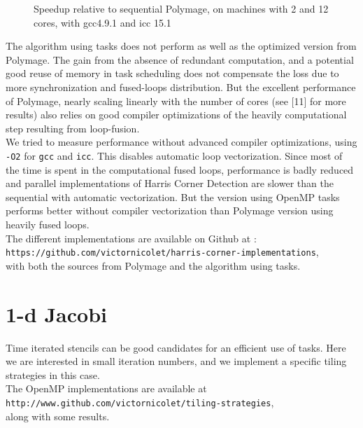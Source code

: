 \documentclass[a4paper,11pt]{article}
\begin{document}
\begin{figure}[h]
  \begin{center}
    
  \end{center}
  \caption{Speedup relative to sequential Polymage, on machines with 2 and 12 cores,
with gcc4.9.1 and icc 15.1}
  \label{results_hcd}
\end{figure}

The algorithm using tasks does not perform as well as the optimized version from Polymage. 
The gain from the absence of redundant computation, and a potential good reuse
of memory in task scheduling does not compensate the loss due to more synchronization
and fused-loops distribution. But the excellent performance of Polymage, nearly scaling
linearly with the number of cores (see [11] for more results) also relies on good compiler
optimizations of the heavily computational step resulting from loop-fusion.\\
We tried to measure performance without advanced compiler optimizations, using \texttt{-O2} for
\texttt{gcc} and \texttt{icc}. This disables automatic loop vectorization. Since most of the time is spent in
the computational fused loops, performance is badly reduced and parallel implementations
of Harris Corner Detection are slower than the sequential with automatic vectorization. 
But the version using OpenMP tasks performs better without compiler vectorization than
Polymage version using heavily fused loops. \\
The different implementations are available on Github at :\\
\texttt{https://github.com/victornicolet/harris-corner-implementations},\\
with both the sources from Polymage and the algorithm using tasks.



\section{1-d Jacobi}
Time iterated stencils can be good candidates for an efficient use of tasks. Here we are
interested in small iteration numbers, and we implement a specific tiling strategies in this
case. \\
The OpenMP implementations are available at \\
\texttt{http://www.github.com/victornicolet/tiling-strategies},\\
along with some results.
\end{document}
